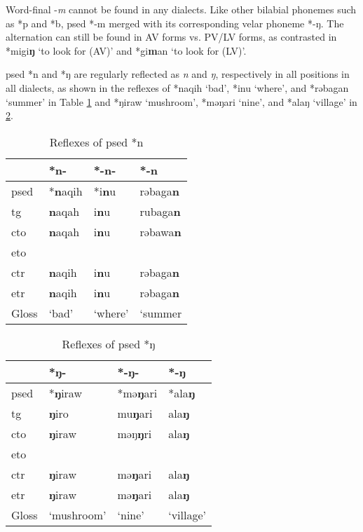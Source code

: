Word-final -\textit{m} cannot be found in any dialects. Like other bilabial phonemes such as *p and *b, \acl{psed} *-m merged with its corresponding velar phoneme *-ŋ. The alternation can still be found in AV forms vs. PV/LV forms, as contrasted in *migi\textbf{ŋ} `to look for (AV)' and *gi\textbf{m}an `to look for (LV)'. 

\acl{psed} *n and *ŋ are regularly reflected as \textit{n} and \textit{ŋ}, respectively in all positions in all dialects, as shown in the reflexes of *naqih `bad', *inu `where', and *rəbagan `summer' in Table \ref{tab:psed_n} and *ŋiraw `mushroom', *məŋari `nine', and *alaŋ `village' in \ref{tab:psed_ŋ}.

\begin{table}[!htbp]
\centering
\caption{Reflexes of \acl{psed} *n}
\label{tab:psed_n}
\begin{tabular}{llll}
\hline
           & *n-    & *-n-    & *-n     \\ \hline
\acs{psed} & *\textbf{n}aqih & *i\textbf{n}u    & rəbaga\textbf{n} \\ \hdashline
\acs{tg}   & \textbf{n}aqah  & i\textbf{n}u     & rubaga\textbf{n} \\
\acs{cto}  & \textbf{n}aqah  & i\textbf{n}u     & rəbawa\textbf{n} \\
\acs{eto}  &        &         &         \\
\acs{ctr}  & \textbf{n}aqih  & i\textbf{n}u     & rəbaga\textbf{n} \\
\acs{etr}  & \textbf{n}aqih  & i\textbf{n}u     & rəbaga\textbf{n} \\ \hline
Gloss      & `bad'  & `where' & `summer \\ \hline
\end{tabular}
\end{table}

\begin{table}[!htbp]
\centering
\caption{Reflexes of \acl{psed} *ŋ}
\label{tab:psed_ŋ}
\begin{tabular}{llll}
\hline
           & *ŋ-        & *-ŋ-    & *-ŋ       \\ \hline
\acs{psed} & *\textbf{ŋ}iraw     & *mə\textbf{ŋ}ari & *ala\textbf{ŋ}     \\ \hdashline
\acs{tg}   & \textbf{ŋ}iro       & mu\textbf{ŋ}ari  & ala\textbf{ŋ}      \\
\acs{cto}  & \textbf{ŋ}iraw      & məŋ\textbf{ŋ}ri  & ala\textbf{ŋ}      \\
\acs{eto}  &            &         &           \\
\acs{ctr}  & \textbf{ŋ}iraw      & mə\textbf{ŋ}ari  & ala\textbf{ŋ}      \\
\acs{etr}  & \textbf{ŋ}iraw      & mə\textbf{ŋ}ari  & ala\textbf{ŋ}      \\ \hline
Gloss      & `mushroom' & `nine'  & `village' \\ \hline
\end{tabular}
\end{table}

